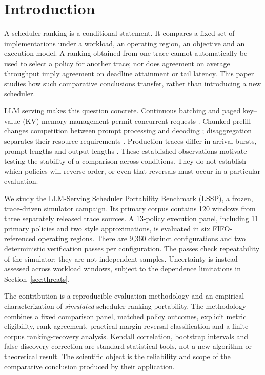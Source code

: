 \section{Introduction}\label{sec:introduction}
A scheduler ranking is a conditional statement. It compares a fixed set of
implementations under a workload, an operating region, an objective and an
execution model. A ranking obtained from one trace cannot automatically be
used to select a policy for another trace; nor does agreement on average
throughput imply agreement on deadline attainment or tail latency. This
paper studies how such comparative conclusions transfer, rather than
introducing a new scheduler.

LLM serving makes this question concrete. Continuous batching and paged
key--value (KV) memory management permit concurrent requests
\citep{kwon2023vllm,yu2022orca}. Chunked prefill changes competition between
prompt processing and decoding \citep{agrawal2024sarathi}; disaggregation
separates their resource requirements \citep{zhong2024distserve,patel2024splitwise}.
Production traces differ in arrival bursts, prompt lengths and output lengths
\citep{burstgpt2025,stojkovic2025dynamollm}. These established observations
motivate testing the stability of a comparison across conditions. They do
not establish which policies will reverse order, or even that reversals
must occur in a particular evaluation.

We study the LLM-Serving Scheduler Portability Benchmark (LSSP), a frozen,
trace-driven simulator campaign. Its primary corpus contains 120 windows
from three separately released trace sources. A 13-policy execution panel,
including 11 primary policies and two style approximations, is evaluated
in six FIFO-referenced operating regions. There are 9,360 distinct
configurations and two deterministic verification passes per configuration.
The passes check repeatability of the simulator; they are not independent
samples. Uncertainty is instead assessed across workload windows, subject
to the dependence limitations in Section~\ref{sec:threats}.

The contribution is a reproducible evaluation methodology and an empirical
characterization of \emph{simulated} scheduler-ranking portability. The
methodology combines a fixed comparison panel, matched policy outcomes,
explicit metric eligibility, rank agreement, practical-margin reversal
classification and a finite-corpus ranking-recovery analysis. Kendall
correlation, bootstrap intervals and false-discovery correction are
standard statistical tools, not a new algorithm or theoretical result.
The scientific object is the reliability and scope of the comparative
conclusion produced by their application.

